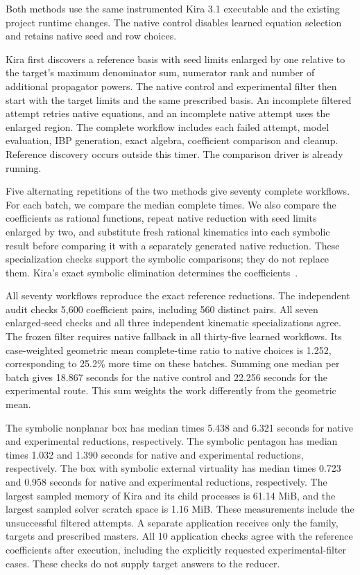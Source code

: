 Both methods use the same instrumented Kira 3.1 executable and the
existing project runtime changes. The native control disables learned
equation selection and retains native seed and row choices.

Kira first discovers a reference basis with seed limits enlarged by
one relative to the target's maximum denominator sum, numerator rank
and number of additional propagator powers.
The native control and experimental filter then start with the
target limits and the same prescribed basis. An incomplete filtered
attempt retries native equations, and an incomplete native attempt
uses the enlarged region. The complete workflow includes each
failed attempt, model evaluation, IBP generation, exact algebra,
coefficient comparison and cleanup. Reference discovery occurs
outside this timer. The comparison driver is already running.

Five alternating repetitions of the two methods give seventy
complete workflows. For each batch, we compare the median complete
times. We also compare the coefficients as rational functions,
repeat native reduction with seed limits enlarged by two, and
substitute fresh rational kinematics into each symbolic result
before comparing it with a separately generated native reduction.
These specialization checks support the symbolic comparisons;
they do not replace them. Kira's exact symbolic elimination
determines the coefficients~\cite{Kira3}.

All seventy workflows reproduce the exact reference reductions. The independent audit checks 5,600 coefficient pairs, including 560 distinct pairs. All seven enlarged-seed checks and all three independent kinematic specializations agree. The frozen filter requires native fallback in all thirty-five learned workflows. Its case-weighted geometric mean complete-time ratio to native choices is 1.252, corresponding to 25.2\% more time on these batches. Summing one median per batch gives 18.867 seconds for the native control and 22.256 seconds for the experimental route. This sum weights the work differently from the geometric mean.

The symbolic nonplanar box has median times 5.438 and 6.321 seconds for native and experimental reductions, respectively. The symbolic pentagon has median times 1.032 and 1.390 seconds for native and experimental reductions, respectively. The box with symbolic external virtuality has median times 0.723 and 0.958 seconds for native and experimental reductions, respectively. The largest sampled memory of Kira and its child processes is 61.14 MiB, and the largest sampled solver scratch space is 1.16 MiB. These measurements include the unsuccessful filtered attempts. A separate application receives only the family, targets and prescribed masters. All 10 application checks agree with the reference coefficients after execution, including the explicitly requested experimental-filter cases. These checks do not supply target answers to the reducer.

